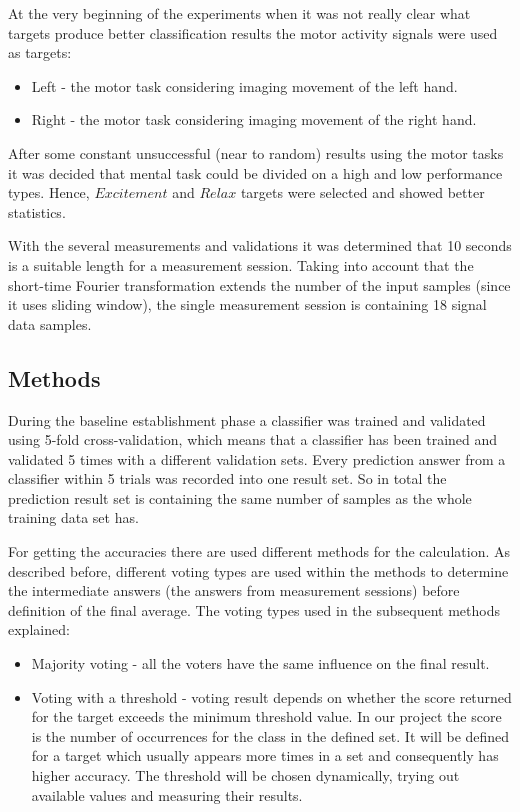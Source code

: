 \documentclass[12pt]{article}
\begin{document}
At the very beginning of the experiments when it was not really clear what targets produce better classification results the motor activity signals were used as targets:
\begin{itemize}
\item Left - the motor task considering imaging movement of the left hand.
\item Right - the motor task considering imaging movement of the right hand.
\end{itemize}
After some constant unsuccessful (near to random) results using the motor tasks it was decided that mental task could be divided on a high and low performance types. Hence, $Excitement$ and $Relax$ targets were selected and showed better statistics.

With the several measurements and validations it was determined that 10 seconds is a suitable length for a measurement session. Taking into account that the short-time Fourier transformation extends the number of the input samples (since it uses sliding window), the single measurement session is containing 18 signal data samples.

\subsection{Methods} \label{methods}

During the baseline establishment phase a classifier was trained and validated using 5-fold cross-validation, which means that a classifier has been trained and validated 5 times with a different validation sets. Every prediction answer from a classifier within 5 trials was recorded into one result set. So in total the prediction result set is containing the same number of samples as the whole training data set has. 

For getting the accuracies there are used different methods for the calculation. As described before, different voting types are used within the methods to determine the intermediate answers (the answers from measurement sessions) before definition of the final average. The voting types used in the subsequent methods explained:
\begin{itemize}
\item Majority voting - all the voters have the same influence on the final result.
\item Voting with a threshold - voting result depends on whether the score returned for the target exceeds the minimum threshold value. In our project the score is the number of occurrences for the class in the defined set. It will be defined for a target which usually appears more times in a set and consequently has higher accuracy. The threshold will be chosen dynamically, trying out available values and measuring their results. 
\end{itemize}
\end{document}
